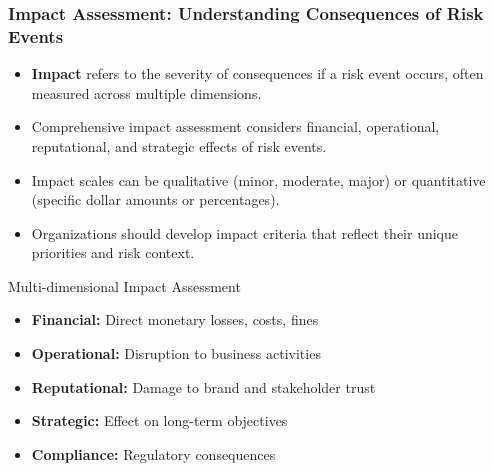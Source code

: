 \documentclass{beamer}
\begin{document}
      \begin{frame}
      \frametitle{Impact Assessment: Understanding Consequences of Risk Events}
      \begin{itemize}
        \item \textbf{Impact} refers to the severity of consequences if a risk event occurs, often measured across multiple dimensions.
        \item Comprehensive impact assessment considers financial, operational, reputational, and strategic effects of risk events.
        \item Impact scales can be qualitative (minor, moderate, major) or quantitative (specific dollar amounts or percentages).
        \item Organizations should develop impact criteria that reflect their unique priorities and risk context.
      \end{itemize}
      
      \begin{block}{Multi-dimensional Impact Assessment}
      \begin{itemize}
        \item \textbf{Financial:} Direct monetary losses, costs, fines
        \item \textbf{Operational:} Disruption to business activities
        \item \textbf{Reputational:} Damage to brand and stakeholder trust
        \item \textbf{Strategic:} Effect on long-term objectives
        \item \textbf{Compliance:} Regulatory consequences
      \end{itemize}
      \end{block}
      \end{frame}
      
\end{document}
